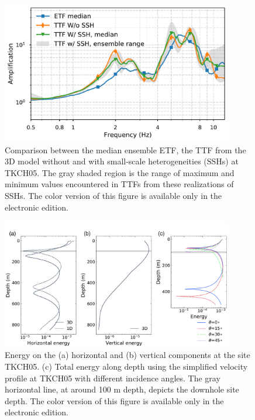 \clearpage
\begin{figure}[!ht]
  \centering
  \includegraphics[width=0.9\textwidth]{figures/figure_etf_10.pdf}
  \caption{Comparison between the median ensemble ETF, the TTF from the 3D model without and with small-scale heterogeneities (SSHs) at TKCH05. The gray shaded region is the range of maximum and minimum values encountered in TTFs from these realizations of SSHs. The color version of this figure is available only in the electronic edition.}
  \label{fig:etf-10}
\end{figure}

\clearpage
\begin{figure}[!ht]
  \centering
  \includegraphics[width=0.9\textwidth]{figures/figure_etf_11.pdf}
  \caption{Energy on the (a) horizontal and (b) vertical components at the site TKCH05. (c) Total energy along depth using the simplified velocity profile at TKCH05 with different incidence angles. The gray horizontal line, at around 100 m depth, depicts the downhole site depth. The color version of this figure is available only in the electronic edition.}
  \label{fig:etf-11}
\end{figure}


\setcounter{table}{0}
\setcounter{figure}{0}
\renewcommand{\thetable}{S\arabic{chapter}.\arabic{table}}
\renewcommand{\thefigure}{S\arabic{chapter}.\arabic{figure}}
\newpage
